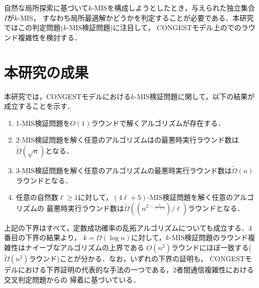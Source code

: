 \documentclass[12pt]{thesis}
\newcommand{\CONGEST}{\textsf{CONGEST}}
\theoremstyle{definition}
\begin{document}
自然な局所探索に基づいて$k$-MISを構成しようとしたとき，与えられた独立集合$I$が$k$-MIS，
すなわち局所最適解かどうかを判定することが必要である．本研究ではこの判定問題($k$-MIS検証問題)に注目して，
{\CONGEST}モデル上のでのラウンド複雑性を検討する．

\section{本研究の成果}
本研究では，{\CONGEST}モデルにおける$k$-MIS検証問題に関して，以下の結果が成立することを示す．
\begin{enumerate}
\item 1-MIS検証問題を$O(1)$ラウンドで解くアルゴリズムが存在する．
\item 2-MIS検証問題を解く任意のアルゴリズムはの最悪時実行ラウンド数は$\tilde{\Omega} (\sqrt{n})$となる．
\item 3-MIS検証問題を解く任意のアルゴリズムの最悪時実行ラウンド数は$\tilde{\Omega}(n)$ラウンドとなる．
\item 任意の自然数$\ell \geq 1$に対して，$(4\ell + 5)$-MIS検証問題を解く任意のアルゴリズムの
最悪時実行ラウンド数は$\tilde{\Omega}\left((n^{2 - \frac{1}{\ell+1}})/\ell\right)$ラウンドとなる．
\end{enumerate}

上記の下界はすべて，定数成功確率の乱拓アルゴリズムについても成立する．4番目の下界の結果より，
$k=\Omega(\log n)$に対して，$k$-MIS検証問題のラウンド複雑性はナイーブなアルゴリズムの上界である
$O(n^2)$ラウンドにほぼ一致する($\tilde{\Omega}(n^2)$ラウンド)ことが分かる．なお，いずれの下界の証明も，
{\CONGEST}モデルにおける下界証明の代表的な手法の一つである，2者間通信複雑性における交叉判定問題からの
帰着に基づいている．
\end{document}
